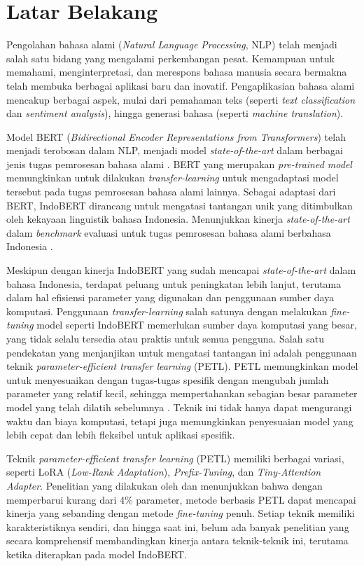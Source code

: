 \section{Latar Belakang}
\label{sec:latar-belakang}

Pengolahan bahasa alami (\textit{Natural Language Processing}, NLP) telah menjadi salah satu bidang yang mengalami perkembangan pesat. Kemampuan untuk memahami, menginterpretasi, dan merespons bahasa manusia secara bermakna telah membuka berbagai aplikasi baru dan inovatif. Pengaplikasian bahasa alami mencakup berbagai aspek, mulai dari pemahaman teks (seperti \textit{text classification} dan \textit{sentiment analysis}), hingga generasi bahasa (seperti \textit{machine translation}).

Model BERT (\textit{Bidirectional Encoder Representations from Transformers}) telah menjadi terobosan dalam NLP, menjadi model \textit{state-of-the-art} dalam berbagai jenis tugas pemrosesan bahasa alami \parencite{bert}. BERT yang merupakan \textit{pre-trained model} memungkinkan untuk dilakukan \textit{transfer-learning} untuk mengadaptasi model tersebut pada tugas pemrosesan bahasa alami lainnya. Sebagai adaptasi dari BERT, IndoBERT dirancang untuk mengatasi tantangan unik yang ditimbulkan oleh kekayaan linguistik bahasa Indonesia. Menunjukkan kinerja \textit{state-of-the-art} dalam \textit{benchmark} evaluasi untuk tugas pemrosesan bahasa alami berbahasa Indonesia \parencite{indobert}.

Meskipun dengan kinerja IndoBERT yang sudah mencapai \textit{state-of-the-art} dalam bahasa Indonesia, terdapat peluang untuk peningkatan lebih lanjut, terutama dalam hal efisiensi parameter yang digunakan dan penggunaan sumber daya komputasi. Penggunaan \textit{transfer-learning} salah satunya dengan melakukan \textit{fine-tuning} model seperti IndoBERT memerlukan sumber daya komputasi yang besar, yang tidak selalu tersedia atau praktis untuk semua pengguna. Salah satu pendekatan yang menjanjikan untuk mengatasi tantangan ini adalah penggunaan teknik \textit{parameter-efficient transfer learning} (PETL). PETL memungkinkan model untuk menyesuaikan dengan tugas-tugas spesifik dengan mengubah jumlah parameter yang relatif kecil, sehingga mempertahankan sebagian besar parameter model yang telah dilatih sebelumnya \parencite{adapter}. Teknik ini tidak hanya dapat mengurangi waktu dan biaya komputasi, tetapi juga memungkinkan penyesuaian model yang lebih cepat dan lebih fleksibel untuk aplikasi spesifik. 

Teknik \textit{parameter-efficient transfer learning} (PETL) memiliki berbagai variasi, seperti LoRA (\textit{Low-Rank Adaptation}), \textit{Prefix-Tuning}, dan \textit{Tiny-Attention Adapter}. Penelitian yang dilakukan oleh \citeauthor{adapter} \parencite{adapter} dan \citeauthor{uvpl} \parencite{uvpl} menunjukkan bahwa dengan memperbarui kurang dari 4\% parameter, metode berbasis PETL dapat mencapai kinerja yang sebanding dengan metode \textit{fine-tuning} penuh. Setiap teknik memiliki karakteristiknya sendiri, dan hingga saat ini, belum ada banyak penelitian yang secara komprehensif membandingkan kinerja antara teknik-teknik ini, terutama ketika diterapkan pada model IndoBERT. 

